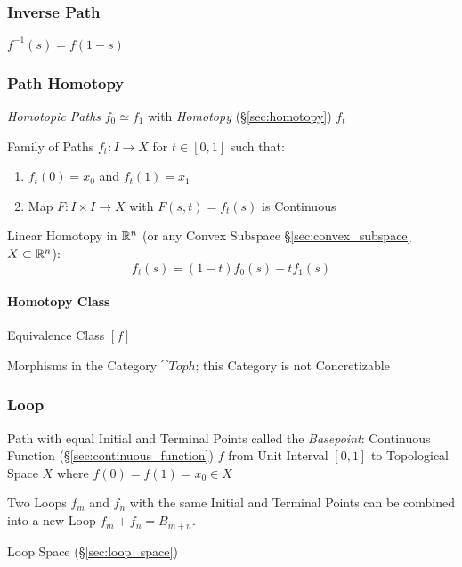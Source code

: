 \subsubsection{Inverse Path}\label{sec:inverse_path}

$f^{-1}(s) = f(1-s)$



\subsubsection{Path Homotopy}\label{sec:path_homotopy}

\emph{Homotopic Paths} $f_0 \simeq f_1$ with \emph{Homotopy}
(\S\ref{sec:homotopy}) $f_t$

Family of Paths $f_t : I \rightarrow X$ for $t \in [0,1]$ such that:
\begin{enumerate}
  \item $f_t(0) = x_0$ and $f_t(1) = x_1$
  \item Map $F : I \times I \rightarrow X$ with $F(s,t) = f_t(s)$ is
    Continuous
\end{enumerate}

Linear Homotopy in $\mathbb{R}^n$ (or any Convex Subspace
\S\ref{sec:convex_subspace} $X \subset \mathbb{R}^n$):
\[
  f_t(s) = (1 - t) f_0(s) + t f_1(s)
\]



\paragraph{Homotopy Class}\label{sec:homotopy_class}\hfill

Equivalence Class $[f]$

Morphisms in the Category $\cat{Toph}$; this Category is not
Concretizable



\subsubsection{Loop}\label{sec:loop}

Path with equal Initial and Terminal Points called the
\emph{Basepoint}: Continuous Function
(\S\ref{sec:continuous_function}) $f$ from Unit Interval $[0,1]$ to
Topological Space $X$ where $f(0) = f(1) = x_0 \in X$

Two Loops $f_m$ and $f_n$ with the same Initial and Terminal Points
can be combined into a new Loop $f_m + f_n = B_{m+n}$.
\cite{hatcher02}

Loop Space (\S\ref{sec:loop_space})

